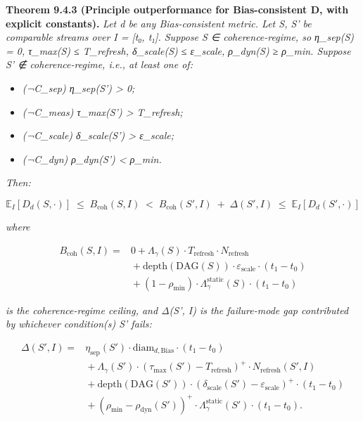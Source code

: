 \documentclass[11pt, openany]{book}
\begin{document}
\textbf{Theorem 9.4.3 (Principle outperformance for Bias-consistent D, with explicit constants).} \textit{Let d be any Bias-consistent metric. Let S, S' be comparable streams over I = [t₀, t₁]. Suppose S ∈ coherence-regime, so η\_\allowbreak{}sep(S) = 0, τ\_\allowbreak{}max(S) ≤ T\_\allowbreak{}refresh, δ\_\allowbreak{}scale(S) ≤ ε\_\allowbreak{}scale, ρ\_\allowbreak{}dyn(S) ≥ ρ\_\allowbreak{}min. Suppose S' ∉ coherence-regime, i.e., at least one of:}

\begin{itemize}
\item \textit{(¬C\_\allowbreak{}sep) η\_\allowbreak{}sep(S') > 0;}
\item \textit{(¬C\_\allowbreak{}meas) τ\_\allowbreak{}max(S') > T\_\allowbreak{}refresh;}
\item \textit{(¬C\_\allowbreak{}scale) δ\_\allowbreak{}scale(S') > ε\_\allowbreak{}scale;}
\item \textit{(¬C\_\allowbreak{}dyn) ρ\_\allowbreak{}dyn(S') < ρ\_\allowbreak{}min.}
\end{itemize}

\textit{Then:}

\[
\mathbb{E}_I[D_d(S, \cdot)] \;\leq\; B_\mathrm{coh}(S, I) \;<\; B_\mathrm{coh}(S', I) \;+\; \Delta(S', I) \;\leq\; \mathbb{E}_I[D_d(S', \cdot)]
\]

\textit{where}

\[
\begin{aligned}
B_\mathrm{coh}(S, I) = {} & 0 + \Lambda_\gamma(S) \cdot T_\mathrm{refresh} \cdot N_\mathrm{refresh} \\
& {} + \mathrm{depth}(\mathrm{DAG}(S)) \cdot \varepsilon_\mathrm{scale} \cdot (t_1 - t_0) \\
& {} + (1 - \rho_\mathrm{min}) \cdot \Lambda_\gamma^\mathrm{static}(S) \cdot (t_1 - t_0)
\end{aligned}
\]

\textit{is the coherence-regime ceiling, and Δ(S', I) is the failure-mode gap contributed by whichever condition(s) S' fails:}

\[
\begin{aligned}
\Delta(S', I) = {} & \eta_\mathrm{sep}(S') \cdot \mathrm{diam}_{d, \mathrm{Bias}} \cdot (t_1 - t_0) \\
& {} + \Lambda_\gamma(S') \cdot (\tau_\mathrm{max}(S') - T_\mathrm{refresh})^+ \cdot N_\mathrm{refresh}(S', I) \\
& {} + \mathrm{depth}(\mathrm{DAG}(S')) \cdot (\delta_\mathrm{scale}(S') - \varepsilon_\mathrm{scale})^+ \cdot (t_1 - t_0) \\
& {} + (\rho_\mathrm{min} - \rho_\mathrm{dyn}(S'))^+ \cdot \Lambda_\gamma^\mathrm{static}(S') \cdot (t_1 - t_0).
\end{aligned}
\]
\end{document}
